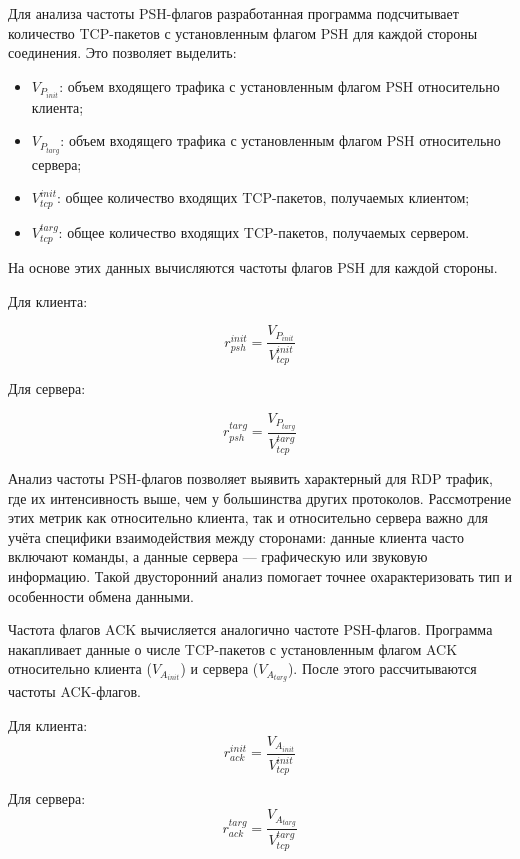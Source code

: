 \documentclass[spec, och, diploma]{SCWorks}
\begin{document}
Для анализа частоты PSH-флагов разработанная программа подсчитывает количество TCP-пакетов с установленным флагом PSH для каждой стороны соединения. 
Это позволяет выделить:

\begin{itemize}
  \item $V_{P_{init}}$: объем входящего трафика с установленным флагом PSH относительно клиента;
  \item $V_{P_{targ}}$: объем входящего трафика с установленным флагом PSH относительно сервера;
  \item $V_{tcp}^{init}$: общее количество входящих TCP-пакетов, получаемых клиентом;
  \item $V_{tcp}^{targ}$: общее количество входящих TCP-пакетов, получаемых сервером.
\end{itemize}

На основе этих данных вычисляются частоты флагов PSH для каждой стороны.

Для клиента:

\begin{equation}
  r_{psh}^{init} = \frac{V_{P_{init}}}{V_{tcp}^{init}}
\end{equation}

Для сервера:

\begin{equation}
  r_{psh}^{targ} = \frac{V_{P_{targ}}}{V_{tcp}^{targ}}
\end{equation}

Анализ частоты PSH-флагов позволяет выявить характерный для RDP трафик, где их интенсивность выше, чем у большинства других протоколов. 
Рассмотрение этих метрик как относительно клиента, так и относительно сервера важно для учёта специфики взаимодействия между сторонами: 
данные клиента часто включают команды, а данные сервера — графическую или звуковую информацию. Такой двусторонний анализ помогает точнее 
охарактеризовать тип и особенности обмена данными.

Частота флагов ACK вычисляется аналогично частоте PSH-флагов. Программа накапливает данные о числе TCP-пакетов с установленным 
флагом ACK относительно клиента ($V_{A_{init}}$) и сервера ($V_{A_{targ}}$). После этого рассчитываются частоты ACK-флагов.

Для клиента:
  \begin{equation}
    r_{ack}^{init} = \frac{V_{A_{init}}}{V_{tcp}^{init}}
  \end{equation}

Для сервера:
  \begin{equation}
    r_{ack}^{targ} = \frac{V_{A_{targ}}}{V_{tcp}^{targ}}
  \end{equation}
\end{document}
